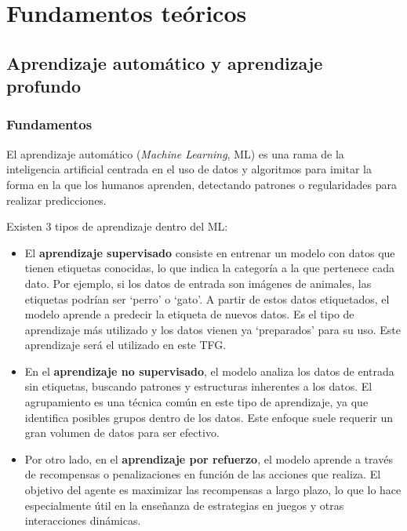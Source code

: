 \chapter{Fundamentos teóricos}
\thispagestyle{empty}

\section{Aprendizaje automático y aprendizaje profundo}

\subsection{Fundamentos}

El aprendizaje automático (\textit{Machine Learning}, ML) \cite{22,23} es una rama de la inteligencia artificial centrada en el uso de datos y algoritmos para imitar la forma en la que los humanos aprenden, detectando patrones o regularidades para realizar predicciones.

Existen 3 tipos de aprendizaje dentro del ML:

\begin{itemize}
	\item El \textbf{aprendizaje supervisado} consiste en entrenar un modelo con datos que tienen etiquetas conocidas, lo que indica la categoría a la que pertenece cada dato. Por ejemplo, si los datos de entrada son imágenes de animales, las etiquetas podrían ser \enquote*{perro} o \enquote*{gato}. A partir de estos datos etiquetados, el modelo aprende a predecir la etiqueta de nuevos datos. Es el tipo de aprendizaje más utilizado y los datos vienen ya \enquote*{preparados} para su uso. Este aprendizaje será el utilizado en este TFG.
	\item En el \textbf{aprendizaje no supervisado}, el modelo analiza los datos de entrada sin etiquetas, buscando patrones y estructuras inherentes a los datos. El agrupamiento es una técnica común en este tipo de aprendizaje, ya que identifica posibles grupos dentro de los datos. Este enfoque suele requerir un gran volumen de datos para ser efectivo.
	\item Por otro lado, en el \textbf{aprendizaje por refuerzo}, el modelo aprende a través de recompensas o penalizaciones en función de las acciones que realiza. El objetivo del agente es maximizar las recompensas a largo plazo, lo que lo hace especialmente útil en la enseñanza de estrategias en juegos y otras interacciones dinámicas.
\end{itemize}

